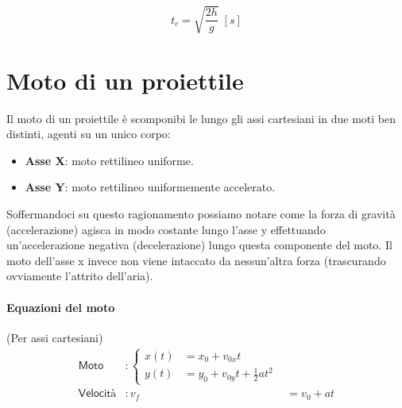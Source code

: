             \begin{equation}
                t_c=\sqrt{\frac{2h}{g}} \; [s]
            \end{equation}

    \section{Moto di un proiettile} 

        Il moto di un proiettile è scomponibi le lungo gli assi cartesiani in 
        due moti ben distinti, agenti su un unico corpo:
        \begin{itemize}
            \item \textbf{Asse X}: moto rettilineo uniforme.
            \item \textbf{Asse Y}: moto rettilineo uniformemente accelerato.
        \end{itemize}
        Soffermandoci su questo ragionamento possiamo notare come la forza di 
        gravità (accelerazione) agisca in modo costante lungo l'asse y 
        effettuando un'accelerazione negativa (decelerazione) lungo questa 
        componente del moto. Il moto dell'asse x invece non viene intaccato da 
        nessun'altra forza (trascurando ovviamente l'attrito dell'aria).
        
        \paragraph{Equazioni del moto}
        (Per assi cartesiani)
        \begin{align}
            \textsf{Moto} &: \begin{cases}
                    x(t) &= x_0 + v_{0x}t \\
                    y(t) &= y_0 + v_{0y}t + \frac{1}{2}at^2
                \end{cases} \\
                \textsf{Velocità} &: v_{f} &= v_{0} + at
        \end{align}

